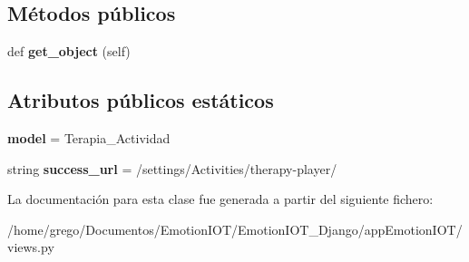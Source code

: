 \subsection*{Métodos públicos}
\begin{DoxyCompactItemize}
\item 
def {\bfseries get\+\_\+object} (self)\hypertarget{classappEmotionIOT_1_1views_1_1Delete__therapy__player_ae03e179889e65f0729263c87a0bd5be3}{}\label{classappEmotionIOT_1_1views_1_1Delete__therapy__player_ae03e179889e65f0729263c87a0bd5be3}

\end{DoxyCompactItemize}
\subsection*{Atributos públicos estáticos}
\begin{DoxyCompactItemize}
\item 
{\bfseries model} = Terapia\+\_\+\+Actividad\hypertarget{classappEmotionIOT_1_1views_1_1Delete__therapy__player_ac86a9bd5660c37f2ea94177756ca2aa8}{}\label{classappEmotionIOT_1_1views_1_1Delete__therapy__player_ac86a9bd5660c37f2ea94177756ca2aa8}

\item 
string {\bfseries success\+\_\+url} = \textquotesingle{}/settings/Activities/therapy-\/player/\textquotesingle{}\hypertarget{classappEmotionIOT_1_1views_1_1Delete__therapy__player_a7d87dd6a994cce819c78266b1a84e295}{}\label{classappEmotionIOT_1_1views_1_1Delete__therapy__player_a7d87dd6a994cce819c78266b1a84e295}

\end{DoxyCompactItemize}


La documentación para esta clase fue generada a partir del siguiente fichero\+:\begin{DoxyCompactItemize}
\item 
/home/grego/\+Documentos/\+Emotion\+I\+O\+T/\+Emotion\+I\+O\+T\+\_\+\+Django/app\+Emotion\+I\+O\+T/views.\+py\end{DoxyCompactItemize}
